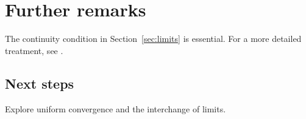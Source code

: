 \section{Further remarks}
\label{sec:remarks}
The continuity condition in Section~\ref{sec:limits} is essential.
For a more detailed treatment, see \cite{rudin1976}.

\subsection{Next steps}
Explore uniform convergence and the interchange of limits.
